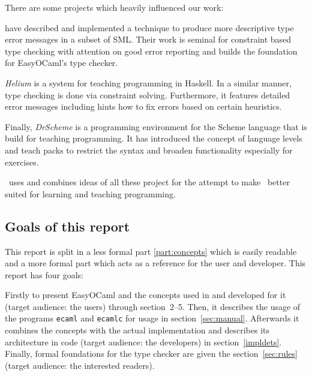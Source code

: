 There are some projects which heavily influenced our work:

\citet{haackwells04} have described and implemented a technique 
to produce more descriptive type error messages in a subset of SML.  
Their work is seminal for constraint based type checking with attention 
on good error reporting and builds the foundation for EasyOCaml's type 
checker.

\emph{Helium} \citep{helium-hw03} is a system for teaching programming 
in Haskell. In a similar manner, type checking is done via constraint 
solving. Furthermore, it features detailed error messages including 
hints how to fix errors based on certain heuristics.

Finally, \emph{DrScheme} \citep{Felleisen98thedrscheme} is a programming 
environment for the Scheme language that is build for teaching 
programming.  It has introduced the concept of language levels and teach 
packs to restrict the syntax and broaden functionality especially for 
exercises.

\easyocaml\ uses and combines ideas of all these project for the attempt to
make \ocaml\ better suited for learning and teaching programming.



\subsection*{Goals of this report}
This report is split in a less formal part \ref{part:concepts} which is easily readable
and a more formal part which acts as a reference for the user and developer.
This report has four goals:

Firstly to present EasyOCaml and the concepts used in and developed for it
(target audience: the users) through section~2--5.
Then, it describes the usage of the programs \texttt{ecaml} and \texttt{ecamlc}
for usage in section~\ref{sec:manual}.
Afterwards it combines the concepts with the actual implementation and
describes its architecture in code (target audience: the developers) in
section~\ref{impldets}.
Finally, formal foundations for the type checker are given the section~\ref{sec:rules} (target
audience: the interested readers).
